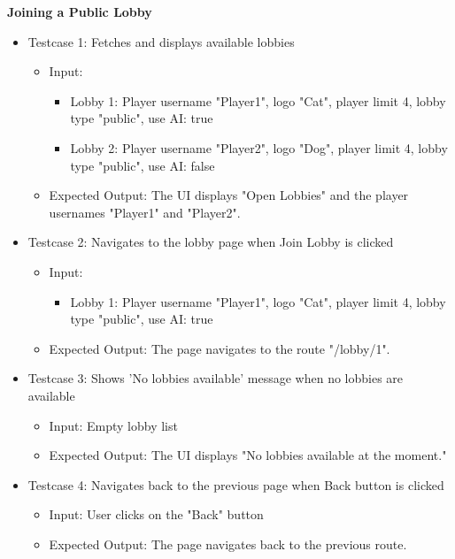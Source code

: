\noindent
\textbf{Joining a Public Lobby}
\begin{itemize}
    \item Testcase 1: Fetches and displays available lobbies
    \begin{itemize}
        \item Input:
            \begin{itemize}
                \item Lobby 1: Player username "Player1", logo "Cat", player limit 4, lobby type "public", use AI: true
                \item Lobby 2: Player username "Player2", logo "Dog", player limit 4, lobby type "public", use AI: false
            \end{itemize}
        \item Expected Output: The UI displays "Open Lobbies" and the player usernames "Player1" and "Player2".
    \end{itemize}

    \item Testcase 2: Navigates to the lobby page when Join Lobby is clicked
    \begin{itemize}
        \item Input:
            \begin{itemize}
                \item Lobby 1: Player username "Player1", logo "Cat", player limit 4, lobby type "public", use AI: true
            \end{itemize}
        \item Expected Output: The page navigates to the route "/lobby/1".
    \end{itemize}

    \item Testcase 3: Shows 'No lobbies available' message when no lobbies are available
    \begin{itemize}
        \item Input: Empty lobby list
        \item Expected Output: The UI displays "No lobbies available at the moment."
    \end{itemize}

    \item Testcase 4: Navigates back to the previous page when Back button is clicked
    \begin{itemize}
        \item Input: User clicks on the "Back" button
        \item Expected Output: The page navigates back to the previous route.
    \end{itemize}
\end{itemize}

